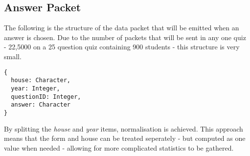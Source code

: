 \subsection{Answer Packet}
The following is the structure of the data packet that will be emitted when an answer is chosen. Due to the number of packets that will be sent in any one quiz - 22,5000 on a 25 question quiz containing 900 students - this structure is very small.

\begin{Verbatim}[fontsize=\small]
{
  house: Character,
  year: Integer,
  questionID: Integer,
  answer: Character
}
\end{Verbatim}
By splitting the \textit{house} and \textit{year} items, normalisation is achieved. This approach means that the form and house can be treated seperately - but computed as one value when needed - allowing for more complicated statistics to be gathered.
